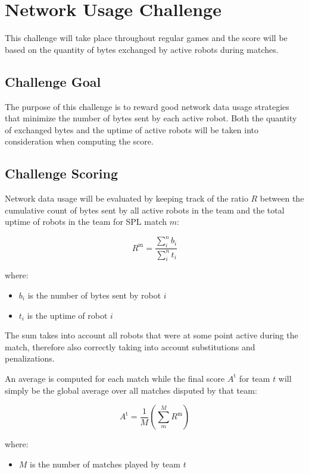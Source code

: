 \section{Network Usage Challenge} %
This challenge will take place throughout regular games and the score will be based on the quantity of bytes exchanged by active robots during matches. 


\subsection{Challenge Goal}
The purpose of this challenge is to reward good network data usage strategies that minimize the number of bytes sent by each active robot. Both the quantity of exchanged bytes and the uptime of active robots will be taken into consideration when computing the score.

\subsection{Challenge Scoring}
Network data usage will be evaluated by keeping track of the ratio $R$ between the cumulative count of bytes sent by all active robots in the team and the total uptime of robots in the team for SPL match $m$:

$$ R^\text{m} = \frac{\sum_{i}^n b_i}{\sum_{i}^n t_i} $$

where:
\begin{itemize}
    \item $b_i$ is the number of bytes sent by robot $i$
    \item $t_i$ is the uptime of robot $i$
\end{itemize}
The sum takes into account all robots that were at some point active during the match, therefore also correctly taking into account substitutions and penalizations.

An average is computed for each match while the final score $A^\text{t}$ for team $t$ will simply be the global average over all matches disputed by that team:

$$ A^\text{t} = \frac{1}{M} \left( \sum_{m}^M R^\text{m} \right) $$

where:
\begin{itemize}
    \item $M$ is the number of matches played by team $t$
\end{itemize}


